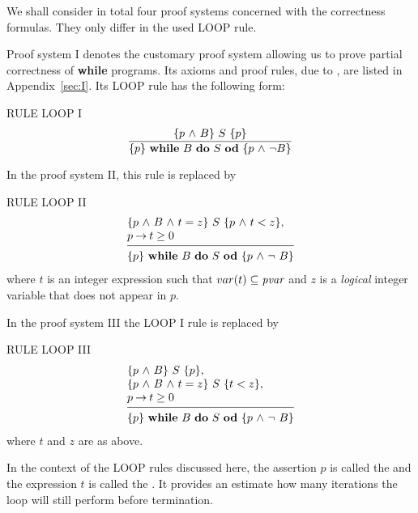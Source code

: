 \documentclass[manuscript, screen, review]{acmart}
\begin{document}


We shall consider in total four proof systems concerned with the
correctness formulas. They only differ in the used LOOP rule.

Proof system I denotes the customary proof system allowing us to prove 
partial correctness of {\bf while} programs.  
Its axioms and proof rules, due to \cite{Hoa69}, are listed in Appendix~\ref{sec:I}.
Its LOOP rule has the following form:
\III

\NI
RULE LOOP I
\[ 
 \frac{ \mbox{$\{{p \mbox{$\ \wedge\ $} B}\}\ {S}\ \{{p}\}$}                }
      { \mbox{$\{{p}\}\ {\mbox{$\mbox{{\bf while}\ } {B}\ \mbox{{\bf do}\ } {S}\ \mbox{{\bf od}}$}}\ \{{p \mbox{$\ \wedge\ $} \neg B}\}$}  }
\]
\III


In the proof system II, this rule  is replaced by
\III

\NI
RULE LOOP II
\[
 \begin{array}{l}
  \HT{p \A B \A t=z}{S}{p \A t<z},          \\
  p \ra t \geq 0                           \\
  [-\medskipamount]
  \hrulefill                                \\
  \HT{p}{\WDD{B}{S}}{p \A \neg\ B}
 \end{array}
\]
where $t$ is an integer expression such that  $var(t)\subseteq \mbox{\it pvar}$
and $z$ is a \emph{logical} integer variable that does not appear in $p$.


\III

In the proof system III the  LOOP I rule is replaced by
\III

\NI
RULE \label{rul:loop2} LOOP III
\[
 \begin{array}{l}
  \HT{p \A B}{S}{p},                      \\
  \HT{p \A B \A t=z}{S}{t<z},             \\
  p \ra t \geq 0                         \\
  [-\medskipamount]
  \hrulefill                              \\
  \HT{p}{\WDD{B}{S}}{p \A \neg\ B}
 \end{array}
\]
%
\NI
where $t$ and $z$ are as above.

\III

In the context of the LOOP rules discussed here, 
the assertion $p$ is called the  and the expression $t$
is called the . It provides an estimate how
many iterations the loop will still perform before termination.
\end{document}
